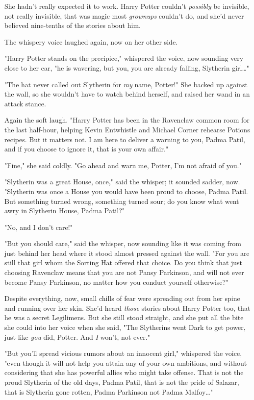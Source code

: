 She hadn't really expected it to work. Harry Potter couldn't \emph{possibly} be 
invisible, not really invisible, that was magic most \emph{grownups} couldn't 
do, and she'd never believed nine-tenths of the stories about him.

The whispery voice laughed again, now on her other side.

"Harry Potter stands on the precipice," whispered the voice, now sounding very 
close to her ear, "he is wavering, but you, you are already falling, Slytherin 
girl{\ldots}"

"The hat never called out Slytherin for \emph{my} name, Potter!" She backed up 
against the wall, so she wouldn't have to watch behind herself, and raised her 
wand in an attack stance.

Again the soft laugh. "Harry Potter has been in the Ravenclaw common room for 
the last half-hour, helping Kevin Entwhistle and Michael Corner rehearse 
Potions recipes. But it matters not. I am here to deliver a warning to you, 
Padma Patil, and if you choose to ignore it, that is your own affair."

"Fine," she said coldly. "Go ahead and warn me, Potter, I'm not afraid of you."

"Slytherin was a great House, once," said the whisper; it sounded sadder, now. 
"Slytherin was once a House you would have been proud to choose, Padma Patil. 
But something turned wrong, something turned sour; do you know what went awry 
in Slytherin House, Padma Patil?"

"No, and I don't care!"

"But you should care," said the whisper, now sounding like it was coming from 
just behind her head where it stood almost pressed against the wall. "For you 
are still that girl whom the Sorting Hat offered that choice. Do you think that 
just choosing Ravenclaw means that you are not Pansy Parkinson, and will not 
ever become Pansy Parkinson, no matter how you conduct yourself otherwise?"

Despite everything, now, small chills of fear were spreading out from her spine 
and running over her skin. She'd heard \emph{those} stories about Harry Potter 
too, that he was a secret Legilimens. But she still stood straight, and she put 
all the bite she could into her voice when she said, "The Slytherins went Dark 
to get power, just like \emph{you} did, Potter. And \emph{I} won't, not ever."

"But you'll spread vicious rumors about an innocent girl," whispered the voice, 
"even though it will not help you attain any of your own ambitions, and without 
considering that she has powerful allies who might take offense. That is not 
the proud Slytherin of the old days, Padma Patil, that is not the pride of 
Salazar, that is Slytherin gone rotten, Padma Parkinson not Padma 
Malfoy{\ldots}"


